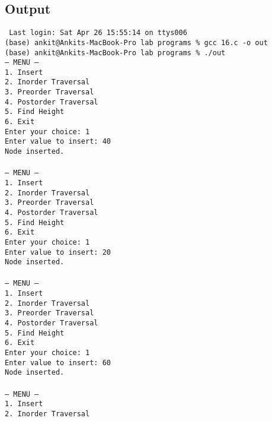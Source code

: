\documentclass[12pt,a4paper]{article}
\begin{document}
\subsection*{Output}
\begin{tcolorbox}[terminalstyle, title=Sample Output]
\texttt{
Last login: Sat Apr 26 15:55:14 on ttys006\\
(base) ankit@Ankits-MacBook-Pro lab programs \% gcc 16.c -o out\\
(base) ankit@Ankits-MacBook-Pro lab programs \% ./out\\
--- MENU ---\\
1. Insert\\
2. Inorder Traversal\\
3. Preorder Traversal\\
4. Postorder Traversal\\
5. Find Height\\
6. Exit\\
Enter your choice: 1\\
Enter value to insert: 40\\
Node inserted.\\
\\
--- MENU ---\\
1. Insert\\
2. Inorder Traversal\\
3. Preorder Traversal\\
4. Postorder Traversal\\
5. Find Height\\
6. Exit\\
Enter your choice: 1\\
Enter value to insert: 20\\
Node inserted.\\
\\
--- MENU ---\\
1. Insert\\
2. Inorder Traversal\\
3. Preorder Traversal\\
4. Postorder Traversal\\
5. Find Height\\
6. Exit\\
Enter your choice: 1\\
Enter value to insert: 60\\
Node inserted.\\
\\
--- MENU ---\\
1. Insert\\
2. Inorder Traversal\\
}
\end{tcolorbox}
\end{document}
